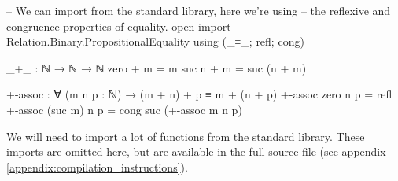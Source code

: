 \documentclass[logo,bsc,singlespacing,parskip,online]{infthesis}
\renewenvironment{code}{\mintedcopy[breaklines,breaksymbolleft=\;]{agda}}{\endmintedcopy}
\begin{document}
\begin{code}
  -- We can import from the standard library, here we're using
  -- the reflexive and congruence properties of equality.
  open import Relation.Binary.PropositionalEquality
    using (_≡_; refl; cong)

  _+_ : ℕ → ℕ → ℕ
  zero  + m = m
  suc n + m = suc (n + m)

  +-assoc : ∀ (m n p : ℕ) → (m + n) + p ≡ m + (n + p)
  +-assoc zero    n p = refl
  +-assoc (suc m) n p = cong suc (+-assoc m n p)
\end{code}


We will need to import a lot of functions from the standard library. These imports are omitted here,
but are available in the full source file (see appendix \ref{appendix:compilation_instructions}).
\begin{comment}
\begin{code}
-- Data types (naturals, strings, characters)
open import Data.Nat using (ℕ; zero; suc; _<_; _≥_; _≤_; _≤?_; _<?_; z≤n; s≤s; _⊔_)
  renaming (_≟_ to _≟ℕ_)
open import Data.Nat.Properties using (≤-refl; ≤-trans; ≤-<-trans; <-≤-trans; ≤-antisym; ≤-total;
  +-mono-≤; n≤1+n; m≤n⇒m≤1+n; suc-injective; <⇒≢; ≰⇒>; ≮⇒≥)
open import Data.String using (String; fromList) renaming (_≟_ to _≟str_; _++_ to _++str_;
  length to str-length; toList to ⟪_⟫)
open import Data.Char using (Char)
open import Data.Char.Properties using () renaming (_≟_ to _≟char_)
open import Data.Unit using (⊤; tt)

-- Function manipulation.
open import Function using (_∘_; flip; it; id; case_returning_of_)

-- Relations and predicates/decidability.
import Relation.Binary.PropositionalEquality as Eq
open Eq using (_≡_; _≢_; refl; sym; trans; cong; cong-app; cong₂)
open Eq.≡-Reasoning using (begin_; step-≡-∣; step-≡-⟩; _∎)
open import Relation.Binary.Definitions using (DecidableEquality)
open import Relation.Nullary.Decidable using (Dec; yes; no; True; False; toWitnessFalse;
  toWitness; fromWitness; ¬?; ⌊_⌋; From-yes)
open import Relation.Unary using (Decidable)
open import Relation.Binary using () renaming (Decidable to BinaryDecidable)
open import Relation.Nullary.Negation using (¬_; contradiction)
open import Data.Empty using (⊥-elim)

-- Products and exists quantifier.
open import Data.Product using (_×_; proj₁; proj₂; ∃-syntax) renaming (_,_ to ⟨_,_⟩)

-- Lists.
open import Data.List using (List; []; _∷_; _++_; length; filter; map; foldr; head; replicate)
open import Data.List.Properties using (≡-dec)
import Data.List.Membership.DecPropositional as DecPropMembership
open import Data.List.Relation.Unary.All using (All; all?; lookup)
  renaming (fromList to All-fromList; toList to All-toList)
open import Data.List.Relation.Unary.Any using (Any; here; there)
open import Data.List.Extrema Data.Nat.Properties.≤-totalOrder using (max; xs≤max)


\end{comment}
\end{document}
